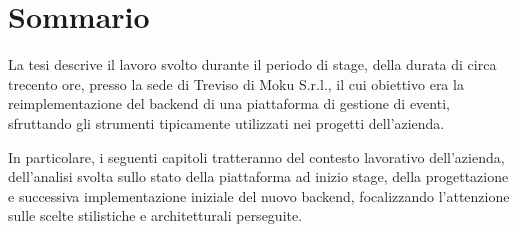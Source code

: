 \cleardoublepage
{}
{}
\begingroup
\let\clearpage\relax
\let\cleardoublepage\relax
\let\cleardoublepage\relax

\chapter*{Sommario}
La tesi descrive il lavoro svolto durante il periodo di stage, della durata di circa trecento ore, presso la sede di Treviso di Moku S.r.l., il cui obiettivo era la reimplementazione del backend di una piattaforma di gestione di eventi, sfruttando gli strumenti tipicamente utilizzati nei progetti dell'azienda.

In particolare, i seguenti capitoli tratteranno del contesto lavorativo dell'azienda, dell'analisi svolta sullo stato della piattaforma ad inizio stage, della progettazione e successiva implementazione iniziale del nuovo backend, focalizzando l'attenzione sulle scelte stilistiche e architetturali perseguite.

%
%

\endgroup			

\vfill
